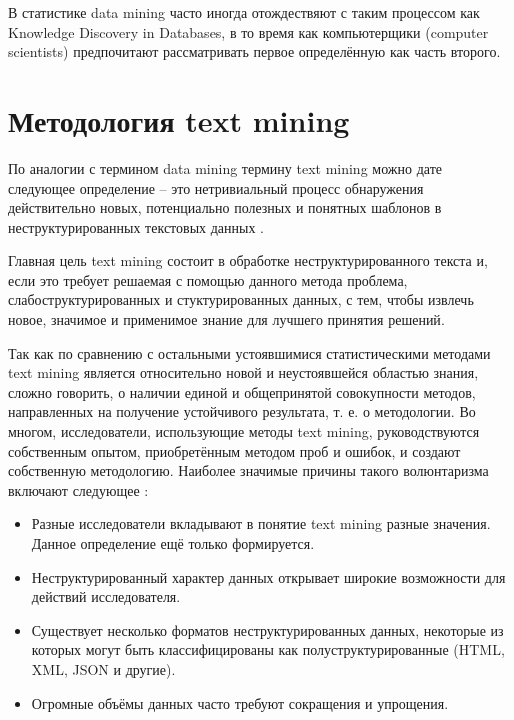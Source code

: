 В статистике data mining часто иногда отождествяют с таким процессом как Knowledge Discovery in Databases, в то время как компьютерщики (computer scientists) предпочитают рассматривать первое определённую как часть второго.





\section{Методология text mining} \label{sect1_3}

По аналогии с термином data mining термину text mining можно дате следующее определение -- это нетривиальный процесс обнаружения действительно новых, потенциально полезных и понятных шаблонов в неструктурированных текстовых данных \cite[стр. 211]{bargesyan2009}.

Главная цель text mining состоит в обработке неструктурированного текста и, если это требует решаемая с помощью данного метода проблема, слабоструктурированных и стуктурированных данных, с тем, чтобы извлечь новое, значимое и применимое знание для лучшего принятия решений\cite[стр. 78]{practical_tm}.

Так как по сравнению с остальными устоявшимися статистическими методами text mining является относительно новой и неустоявшейся областью знания, сложно говорить, о наличии единой и общепринятой совокупности методов, направленных на получение устойчивого результата, т. е. о методологии. Во многом, исследователи, использующие методы text mining, руководствуются собственным опытом, приобретённым методом проб и ошибок, и создают собственную методологию. Наиболее значимые причины такого волюнтаризма включают следующее \cite[стр. 74]{practical_tm}:
\begin{itemize}
\item Разные исследователи вкладывают в понятие text mining разные значения. Данное определение ещё только формируется.
\item Неструктурированный характер данных открывает широкие возможности для действий исследователя.
\item Существует несколько форматов неструктурированных данных, некоторые из которых могут быть классифицированы как полуструктурированные (HTML, XML, JSON и другие).
\item Огромные объёмы данных часто требуют сокращения и упрощения.
\end{itemize}

